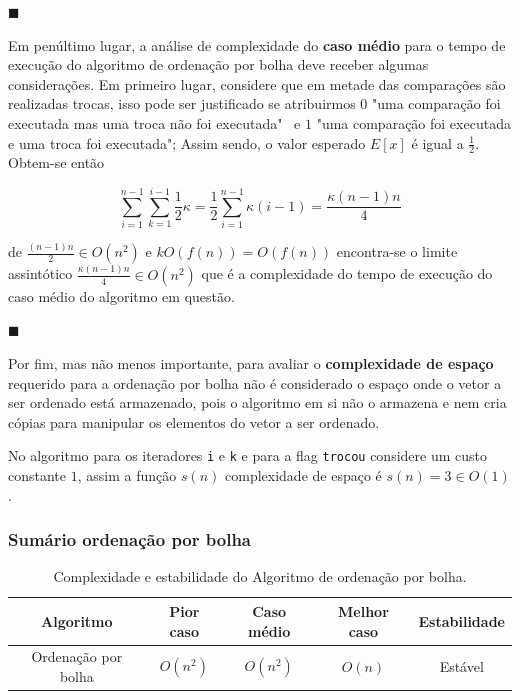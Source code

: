 {\raggedleft $\blacksquare $ \par}

Em penúltimo lugar, a análise de complexidade do \textbf{caso médio} para o tempo de execução do algoritmo de ordenação por bolha deve receber algumas considerações. Em primeiro lugar, considere que em metade das comparações são realizadas trocas, isso pode ser justificado se atribuirmos $0$ "uma comparação foi executada mas uma troca não foi executada" \ e $1$ "uma comparação foi executada e uma troca foi executada"; Assim sendo, o valor esperado $E[x]$ é igual a $\frac{1}{2}$. Obtem-se então

\[\sum_{i=1}^{n-1}\sum_{k=1}^{i-1}\frac{1}{2}\kappa = \frac{1}{2}\sum_{i=1}^{n-1}\kappa(i-1) =  \frac{\kappa (n-1)n}{4}\]

de $\frac{(n-1)n}{2} \in O(n^2)$ e $kO(f(n))=O(f(n))$ encontra-se o limite assintótico $\frac{\kappa(n-1)n}{4} \in O(n^2)$ que é a complexidade do tempo de execução do caso médio do algoritmo em questão.

{\raggedleft $\blacksquare $ \par}

Por fim, mas não menos importante, para avaliar o \textbf{complexidade de espaço} requerido para a ordenação por bolha não é considerado o espaço onde o vetor a ser ordenado está armazenado, pois o algoritmo em si não o armazena e nem cria cópias para manipular os elementos do vetor a ser ordenado.

No algoritmo para os iteradores \texttt{i} e \texttt{k}  e para a flag \texttt{trocou} considere um custo constante $1$, assim a função $s(n)$ complexidade de espaço é $s(n) = 3 \in O(1)$.

\subsubsection{Sumário ordenação por bolha}

\begin{table}[h]
\centering
\begin{tabular}{|c|c|c|c|c|}
\hline
\textbf{Algoritmo} & \textbf{Pior caso} & \textbf{Caso médio} & \textbf{Melhor caso} & \textbf{Estabilidade} \\ \hline
Ordenação por bolha       & \(O(n^2)\)         & \(O(n^2)\)             & \(O(n)\)           & Estável                \\ \hline
\end{tabular}
\caption{Complexidade e estabilidade do Algoritmo de ordenação por bolha.}
\label{Sumario bubble sort}
\end{table}

